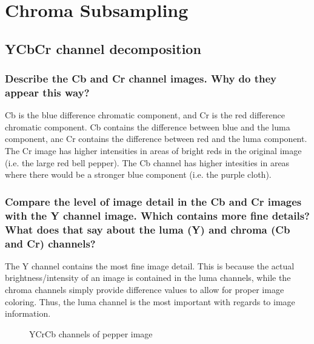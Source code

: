 \section{Chroma Subsampling}


\subsection{YCbCr channel decomposition}

\subsubsection{Describe the Cb and Cr channel images. Why do they appear this way?}

Cb is the blue difference chromatic component, and Cr is the red difference chromatic component. Cb contains the difference between blue and the luma component, anc Cr contains the difference between red and the luma component. The Cr image has higher intensities in areas of bright reds in the original image (i.e. the large red bell pepper). The Cb channel has higher intesities in areas where there would be a stronger blue component (i.e. the purple cloth).

\subsubsection{Compare the level of image detail in the Cb and Cr images with the Y channel image. Which contains more fine details? What does that say about the luma (Y) and chroma (Cb and Cr) channels?}

The Y channel contains the most fine image detail. This is because the actual brightness/intensity of an image is contained in the luma channels, while the chroma channels simply provide difference values to allow for proper image coloring. Thus, the luma channel is the most important with regards to image information.

\begin{figure}[ht]
\centering
	\caption{YCrCb channels of pepper image}
	\label{fig:noiseGeneration.toy}
\end{figure}
 	
